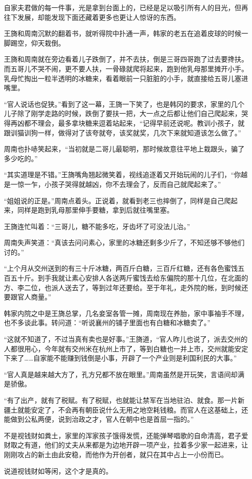 自家夫君做的每一件事，光是拿到台面上的，已经是足以吸引所有人的目光，但再往下发展，却能发现下面还藏着更多也更让人惊讶的东西。

王旖和周南沉默的翻着书，就听得院中扑通一声，韩家的老五在追着皮球的时候一脚踢空，仰天栽倒。

王旖和周南就在旁边看着儿子跌倒了，并不去扶，倒是三哥四哥跑了过去要搀扶。而五哥儿不哭不闹，更不要人扶，一骨碌就爬将起来，跑到他乳母那里摊开小手。乳母忙掏出一粒半透明的冰糖来，看着眼前一只脏脏的小手，就直接给五哥儿塞进嘴里。

“官人说话也促狭。”看到了这一幕，王旖一下笑了，也是韩冈的要求，家里的几个儿子除了刚学走路的时候，跌倒了要扶一把，大一点之后都让他们自己爬起来，哭得再凶都不理会，最多拿块糖来逗着站起来，“记得早前还说呢。教训小孩子，就跟训猫训狗一样，做得对了该夸就夸，该奖就奖，几次下来就知道该怎么做了。”

周南也扑哧笑起来，“当初就是二哥儿最聪明，那时候故意往平地上栽跟头，骗了多少吃的。”

“其实道理是不错。”王旖嘴角翘起微笑着，视线追逐着又开始玩闹的儿子们，“你越是一惊一乍，小孩子哭得就越凶，你不去理会了，反而自己就爬起来了。”

“姐姐说的正是。”周南点着头。正说着，就看到老三也摔倒了，同样是自己爬起来，同样是跑到乳母那里伸手要糖，拿到后就往嘴里塞。

王旖连忙叫着：“三哥儿，糖不能多吃，牙齿坏了可没法儿治。”

周南失声笑道：“真该去问问素心，家里的冰糖还剩多少斤了，不知还够不够他们讨的。”

“上个月从交州送到的有三十斤冰糖，两百斤白糖，三百斤红糖，还有各色蜜饯五百五十斤。到手我就让素心安排人各送两斤蜜饯去给东偏院的那十几位，在北面的方、李二位，也派人送去了，等到过年还要给。至于年礼，走外院的帐，到时候还要跟官人商量。”

韩家内院之中是王旖总掌，几名妾室各管一摊，周南现在养胎，家中事袖手不理，也不多谈此事。转问道：“听说襄州的铺子里面也有白糖和冰糖卖了。”

“这就不知道了，不过当真有卖也是好事。”王旖道，“官人昨儿也说了，派去交州的人都很用心，今年就有交州米在杭州上市了，等到白糖也一并上市，交州就能安定下来了……自家能不能赚到钱倒是小事，开辟了一个产业则是利国利民的大事。”

“官人真是越来越大方了，孔方兄都不放在眼里。”周南虽然是开玩笑，言语间却满是骄傲。

“有了出产，就有了税赋。有了税赋，也就能让禁军在当地驻泊、就食。那一片新疆土就能安定了，不会再有朝臣说什么无用之地空耗钱粮。而官人在这基础上，还能做到公私两便，说到治政之才，官人在朝中也是首屈一指的。”

不是视钱财如粪土，家里的浑家孩子饿得发慌，还能弹琴唱歌的自命清高，君子爱财取之有道，他们的丈夫从来都是为边地开辟一项产业，拉着多少家一起进来，让刚刚攻占的新土由此安稳，而他作为开创者，就只在其中占上一小份而已。

说道视钱财如等闲，这个才是真的。

